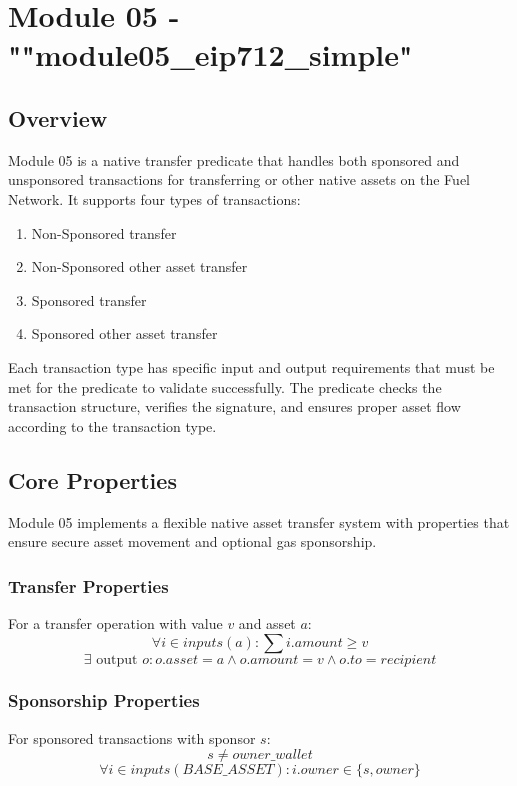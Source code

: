 \newpage
\section{Module 05 - {\ttfamily ""module05\_eip712\_simple"}}
\label{sec:module05_predicate}

\subsection{Overview}
Module 05 is a native transfer predicate that handles both sponsored and unsponsored transactions for transferring  or other
native assets on the Fuel Network. It supports four types of transactions:\\

\begin{enumerate}
\item Non-Sponsored  transfer
\item Non-Sponsored other asset transfer
\item Sponsored  transfer
\item Sponsored other asset transfer
\end{enumerate}

Each transaction type has specific input and output requirements that must be met for the predicate to validate successfully. The predicate
checks the transaction structure, verifies the signature, and ensures proper asset flow according to the transaction type.




%

\subsection{Core Properties}
Module 05 implements a flexible native asset transfer system with properties that ensure secure asset movement and optional gas sponsorship.

\subsubsection{Transfer Properties}
For a transfer operation with value $v$ and asset $a$:
\[ \forall i \in inputs(a): \sum i.amount \geq v \]
\[ \exists \text{ output } o : o.asset = a \land o.amount = v \land o.to = recipient \]

\subsubsection{Sponsorship Properties}
For sponsored transactions with sponsor $s$:
\[ s \neq owner\_wallet \]
\[ \forall i \in inputs(BASE\_ASSET): i.owner \in \{s, owner\} \]



